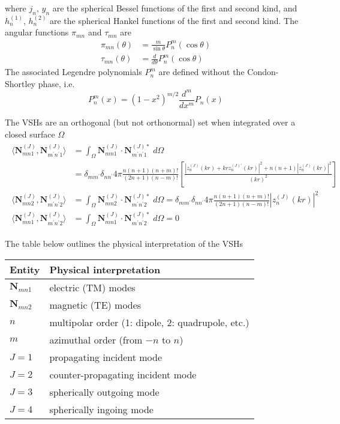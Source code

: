 \documentclass[11pt]{article}
\begin{document}
where $j_n$, $y_n$ are the spherical Bessel functions of the first and second kind, and $h_n^{(1)}$, $h_n^{(2)}$ are the spherical Hankel functions of the first and second kind.
The angular functions $\pi_{mn}$ and $\tau_{mn}$ are
\begin{align}
\pi_{mn}(\theta) &= \frac{m}{\sin\theta} P_n^m(\cos\theta) \\
\tau_{mn}(\theta) &= \frac{d}{d\theta} P_n^m(\cos\theta) 
\end{align}
The associated Legendre polynomials $P_n^m$ are defined without the Condon-Shortley phase, i.e.\
\begin{equation}
P_n^m(x) = (1 - x^2)^{m/2} \frac{d^m}{dx^m} P_n(x)
\end{equation}

The VSHs are an orthogonal (but not orthonormal) set when integrated over a closed surface $\Omega$
\begin{align}
\begin{split}
    \langle \boldsymbol{N}_{mn1}^{(J)}, \boldsymbol{N}_{m^\prime n^\prime 1}^{(J)} \rangle
    &= \int_\Omega \boldsymbol{N}_{mn1}^{(J)} \cdot \boldsymbol{N}_{m^\prime n^\prime 1}^{(J)*} \;d\Omega \\
    &= \delta_{mm^\prime}\delta_{nn^\prime}4\pi \frac{n(n+1)(n+m)!}{(2n+1)(n-m)!}
      \left[ \frac{\left|z_n^{(J)}(kr) + krz_n^{(J)\prime}(kr)\right|^2 + n(n+1) \left|z_n^{(J)}(kr)\right|^2 }{(kr)^2} \right] \\
    \langle \boldsymbol{N}_{mn2}^{(J)}, \boldsymbol{N}_{m^\prime n^\prime 2}^{(J)} \rangle
    &= \int_\Omega \boldsymbol{N}_{mn2}^{(J)} \cdot \boldsymbol{N}_{m^\prime n^\prime 2}^{(J)*} \;d\Omega
    = \delta_{mm^\prime}\delta_{nn^\prime}4\pi \frac{n(n+1)(n+m)!}{(2n+1)(n-m)!} |z_n^{(J)}(kr)|^2 \\
    \langle \boldsymbol{N}_{mn1}^{(J)}, \boldsymbol{N}_{m^\prime n^\prime 2}^{(J)} \rangle
    &= \int_\Omega \boldsymbol{N}_{mn1}^{(J)} \cdot \boldsymbol{N}_{m^\prime n^\prime 2}^{(J)*} \;d\Omega = 0
\end{split}
\end{align}

The table below outlines the physical interpretation of the VSHs
\begin{center}
 \begin{tabular}{|l l|} 
 \hline
 \textbf{Entity} & \textbf{Physical interpretation}  \\ [0.5ex] 
 \hline\hline
 $\bm{N}_{mn1}$ & electric (TM) modes \\ 
 $\bm{N}_{mn2}$ & magnetic (TE) modes \\ 
 \hline
 $n$ & multipolar order (1: dipole, 2: quadrupole, etc.) \\
 $m$ & azimuthal order (from $-n$ to $n$) \\
 \hline
 $J=1$ & propagating incident mode \\ 
 $J=2$ & counter-propagating incident mode \\ 
 $J=3$ & spherically outgoing mode \\ 
 $J=4$ & spherically ingoing mode \\
 \hline
\end{tabular}
\end{center}
\end{document}
